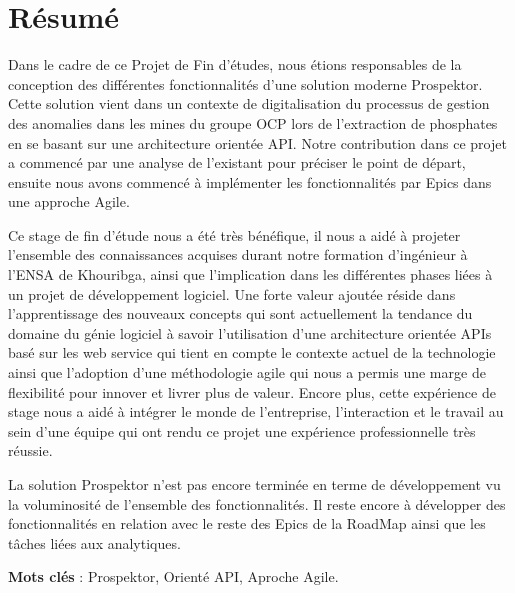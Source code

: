 \chapter*{R\'esum\'e}

Dans le cadre de ce Projet de Fin d'\'etudes, nous \'etions responsables de la conception des diff\'erentes fonctionnalit\'es d'une solution moderne Prospektor. Cette solution vient dans un contexte de digitalisation du processus de gestion des anomalies dans les mines du groupe \gls{OCP} lors de l'extraction de phosphates en se basant sur une architecture orient\'ee \gls{API}. Notre contribution dans ce projet a commenc\'e par une analyse de l'existant pour pr\'eciser le point de d\'epart, ensuite nous avons commenc\'e \`a impl\'ementer les fonctionnalit\'es par Epics dans une approche Agile.

Ce stage de fin d'\'etude nous a \'et\'e tr\`es b\'en\'efique, il nous a aid\'e \`a projeter l'ensemble des connaissances acquises durant notre formation d'ing\'enieur \`a l'ENSA de Khouribga, ainsi que l'implication dans les diff\'erentes phases li\'ees \`a un projet de d\'eveloppement logiciel. Une forte valeur ajout\'ee r\'eside dans l'apprentissage des nouveaux concepts qui sont actuellement la tendance du domaine du g\'enie logiciel \`a savoir l'utilisation d'une architecture orient\'ee \gls{API}s bas\'e sur les web service qui tient en compte le contexte actuel de la technologie ainsi que l'adoption d'une m\'ethodologie agile qui nous a permis une marge de flexibilit\'e pour innover et livrer plus de valeur. Encore plus, cette exp\'erience de stage nous a aid\'e \`a int\'egrer le monde de l'entreprise, l'interaction et le travail au sein d'une \'equipe qui ont rendu ce projet une exp\'erience professionnelle tr\`es r\'eussie.

La solution Prospektor n'est pas encore termin\'ee en terme de d\'eveloppement vu la voluminosit\'e de l'ensemble des fonctionnalit\'es. Il reste encore à d\'evelopper des fonctionnalit\'es en relation avec le reste des Epics de la RoadMap ainsi que les t\^aches li\'ees aux analytiques.

\vspace{1.5\baselineskip}

\textbf{Mots cl\'es} : Prospektor, Orient\'e API, Aproche Agile.